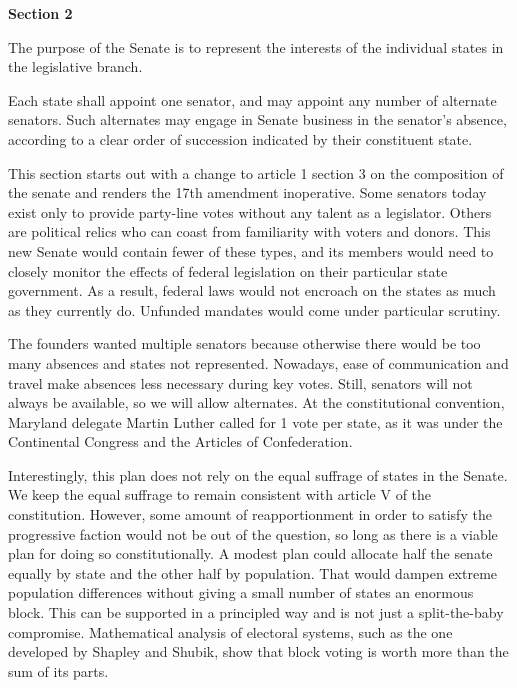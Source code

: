\documentclass{article}
\begin{document}
\begin{quoting}
\textbf{Section 2}

The purpose of the Senate is to represent the interests of the individual states in the legislative branch.

Each state shall appoint one senator, and may appoint any number of alternate senators. Such alternates may engage in Senate business in the senator’s absence, according to a clear order of succession indicated by their constituent state.
\end{quoting}

This section starts out with a change to article 1 section 3 on the composition of the senate and renders the 17th amendment inoperative. Some senators today exist only to provide party-line votes without any talent as a legislator. Others are political relics who can coast from familiarity with voters and donors. This new Senate would contain fewer of these types, and its members would need to closely monitor the effects of federal legislation on their particular state government. As a result, federal laws would not encroach on the states as much as they currently do. Unfunded mandates would come under particular scrutiny.

The founders wanted multiple senators because otherwise there would be too many absences and states not represented. Nowadays, ease of communication and travel make absences less necessary during key votes. Still, senators will not always be available, so we will allow alternates. At the constitutional convention, Maryland delegate Martin Luther called for 1 vote per state, as it was under the Continental Congress and the Articles of Confederation\cite{Senate}.

Interestingly, this plan does not rely on the equal suffrage of states in the Senate. We keep the equal suffrage to remain consistent with article V of the constitution. However, some amount of reapportionment in order to satisfy the progressive faction would not be out of the question, so long as there is a viable plan for doing so constitutionally\cite{Amar}. A modest plan could allocate half the senate equally by state and the other half by population. That would dampen extreme population differences without giving a small number of states an enormous block. This can be supported in a principled way and is not just a split-the-baby compromise. Mathematical analysis of electoral systems, such as the one developed by Shapley and Shubik\cite{Shapley}, show that block voting is worth more than the sum of its parts\cite{Gross}.
\end{document}
